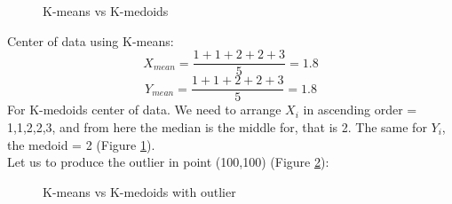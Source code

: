 \documentclass[12pt,a4paper]{article}
\begin{document}
\begin{enumerate}[label=(\alph*)]
\begin{figure}[h]
\caption{K-means vs K-medoids}
\label{ris:K}
\end{figure}
Center of data using K-means:\\
$$
\displaystyle X_{mean} = \frac{1+1+2+2+3}{5} = 1.8 
$$
$$
\displaystyle Y_{mean} = \frac{1+1+2+2+3}{5} = 1.8 
$$
For K-medoids center of data. We need to arrange $X_i$ in ascending order = 1,1,2,2,3, and from here the median is the middle for, that is 2. The same for $Y_i$, the medoid = 2 (Figure \ref{ris:K}).\\
Let us to produce the outlier in point (100,100) (Figure \ref{ris:K1}):
\begin{figure}[h]
	\caption{K-means vs K-medoids with outlier}
	\label{ris:K1}
\end{figure}


\end{enumerate}
\end{document}
